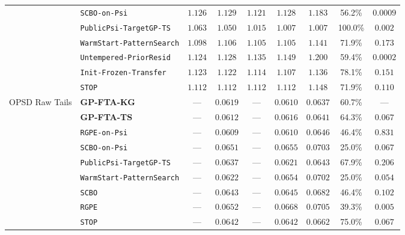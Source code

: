 \begin{table}[htbp]
{\begin{tabular}{llccccccc}
 & \texttt{SCBO-on-Psi} & $1.126$ & $1.129$ & $1.121$ & $1.128$ & $1.183$ & 56.2\% & $0.0009$ \\
 & \texttt{PublicPsi-TargetGP-TS} & $\mathbf{1.063}$ & $\mathbf{1.050}$ & $\mathbf{1.015}$ & $\mathbf{1.007}$ & $\mathbf{1.007}$ & 100.0\% & $0.002$ \\
 & \texttt{WarmStart-PatternSearch} & $1.098$ & $1.106$ & $1.105$ & $1.105$ & $1.141$ & 71.9\% & $0.173$ \\
 & \texttt{Untempered-PriorResid} & $1.124$ & $1.128$ & $1.135$ & $1.149$ & $1.200$ & 59.4\% & $0.0002$ \\
 & \texttt{Init-Frozen-Transfer} & $1.123$ & $1.122$ & $1.114$ & $1.107$ & $1.136$ & 78.1\% & $0.151$ \\
 & \texttt{STOP} & $1.112$ & $1.112$ & $1.112$ & $1.112$ & $1.148$ & 71.9\% & $0.110$ \\
\midrule
\multirow{9}{*}{OPSD Raw Tails} & \textbf{GP-FTA-KG} & --- & $0.0619$ & --- & $0.0610$ & $\mathbf{0.0637}$ & 60.7\% & --- \\
 & \textbf{GP-FTA-TS} & --- & $0.0612$ & --- & $0.0616$ & $0.0641$ & 64.3\% & $0.067$ \\
 & \texttt{RGPE-on-Psi} & --- & $\mathbf{0.0609}$ & --- & $\mathbf{0.0610}$ & $0.0646$ & 46.4\% & $0.831$ \\
 & \texttt{SCBO-on-Psi} & --- & $0.0651$ & --- & $0.0655$ & $0.0703$ & 25.0\% & $0.067$ \\
 & \texttt{PublicPsi-TargetGP-TS} & --- & $0.0637$ & --- & $0.0621$ & $0.0643$ & 67.9\% & $0.206$ \\
 & \texttt{WarmStart-PatternSearch} & --- & $0.0622$ & --- & $0.0654$ & $0.0702$ & 25.0\% & $0.054$ \\
 & \texttt{SCBO} & --- & $0.0643$ & --- & $0.0645$ & $0.0682$ & 46.4\% & $0.102$ \\
 & \texttt{RGPE} & --- & $0.0652$ & --- & $0.0668$ & $0.0705$ & 39.3\% & $0.005$ \\
 & \texttt{STOP} & --- & $0.0642$ & --- & $0.0642$ & $0.0662$ & 75.0\% & $0.067$ \\
\bottomrule
\end{tabular}%
}
\end{table}